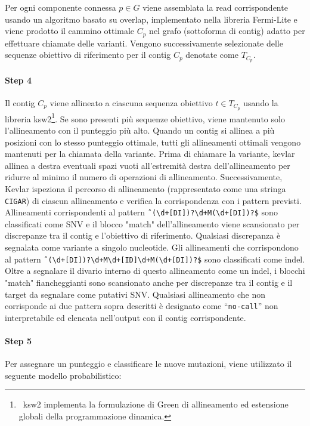 \documentclass[../main.tex]{subfiles}
\begin{document}
Per ogni componente connessa $p\in G$ viene assemblata la read corrispondente usando un algoritmo basato su overlap, implementato nella libreria Fermi-Lite e viene prodotto il cammino ottimale $C_p$ nel grafo (sottoforma di contig) adatto per effettuare chiamate delle varianti. Vengono successivamente selezionate delle sequenze obiettivo di riferimento per il contig $C_p$ denotate come $T_{C_p}$.

\paragraph{Step 4} Il contig $C_p$ viene allineato a ciascuna sequenza obiettivo $t \in T_{C_p}$ usando la libreria ksw2\footnote{\ ksw2 implementa la formulazione di Green di allineamento ed estensione globali della programmazione dinamica.}. 
Se sono presenti più sequenze obiettivo, viene mantenuto solo l'allineamento con il punteggio più alto. Quando un contig si allinea a più posizioni con lo stesso punteggio ottimale, tutti gli allineamenti ottimali vengono mantenuti per la chiamata della variante.
Prima di chiamare la variante, kevlar allinea a destra eventuali spazi vuoti all'estremità destra dell'allineamento per ridurre al minimo il numero di operazioni di allineamento. Successivamente, Kevlar ispeziona il percorso di allineamento (rappresentato come una stringa \texttt{CIGAR}) di ciascun allineamento e verifica la corrispondenza con i pattern previsti. Allineamenti corrispondenti al pattern \verb|ˆ(\d+[DI])?\d+M(\d+[DI])?$| sono classificati come SNV e il blocco "match" dell'allineamento viene scansionato per discrepanze tra il contig e l'obiettivo di riferimento. Qualsiasi discrepanza è segnalata come variante a singolo nucleotide. Gli allineamenti che corrispondono al pattern \verb|ˆ(\d+[DI])?\d+M\d+[ID]\d+M(\d+[DI])?$| sono classificati come indel. Oltre a segnalare il divario interno di questo allineamento come un indel, i blocchi "match" fiancheggianti sono
scansionato anche per discrepanze tra il contig e il target da segnalare come putativi SNV. Qualsiasi allineamento che non corrisponde ai due pattern sopra descritti è designato come ``\texttt{no-call}'' non interpretabile ed elencata nell'output con il contig corrispondente. 

\paragraph{Step 5} Per assegnare un punteggio e classificare le nuove mutazioni, viene utilizzato il seguente modello probabilistico:
\end{document}
